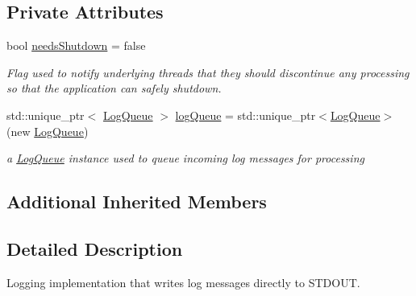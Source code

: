 \subsection*{Private Attributes}
\begin{DoxyCompactItemize}
\item 
\mbox{\label{class_aws_1_1_iot_1_1_device_client_1_1_logging_1_1_std_out_logger_a4e526296245920334c21e20e5cad0d75}} 
bool \hyperlink{class_aws_1_1_iot_1_1_device_client_1_1_logging_1_1_std_out_logger_a4e526296245920334c21e20e5cad0d75}{needs\+Shutdown} = false
\begin{DoxyCompactList}\small\item\em Flag used to notify underlying threads that they should discontinue any processing so that the application can safely shutdown. \end{DoxyCompactList}\item 
\mbox{\label{class_aws_1_1_iot_1_1_device_client_1_1_logging_1_1_std_out_logger_a0c39b3bc0fa3164c5efc793fa54c58eb}} 
std\+::unique\+\_\+ptr$<$ \hyperlink{class_aws_1_1_iot_1_1_device_client_1_1_logging_1_1_log_queue}{Log\+Queue} $>$ \hyperlink{class_aws_1_1_iot_1_1_device_client_1_1_logging_1_1_std_out_logger_a0c39b3bc0fa3164c5efc793fa54c58eb}{log\+Queue} = std\+::unique\+\_\+ptr$<$\hyperlink{class_aws_1_1_iot_1_1_device_client_1_1_logging_1_1_log_queue}{Log\+Queue}$>$(new \hyperlink{class_aws_1_1_iot_1_1_device_client_1_1_logging_1_1_log_queue}{Log\+Queue})
\begin{DoxyCompactList}\small\item\em a \hyperlink{class_aws_1_1_iot_1_1_device_client_1_1_logging_1_1_log_queue}{Log\+Queue} instance used to queue incoming log messages for processing \end{DoxyCompactList}\end{DoxyCompactItemize}
\subsection*{Additional Inherited Members}


\subsection{Detailed Description}
Logging implementation that writes log messages directly to S\+T\+D\+O\+UT. 

